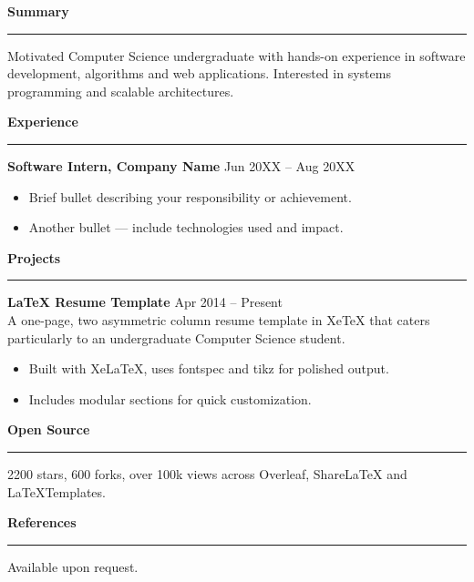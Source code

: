 \documentclass[11pt]{article}
\newcommand{\headingfont}{\sffamily}
\newcommand{\sectitle}[1]{%
  \vspace{4pt}\noindent\textbf{\large\headingfont\color{accent}#1}\vspace{4pt}\par
  \vspace{3pt}\hrule\vspace{5pt}
}
\begin{document}
\begin{minipage}[t]{0.70\textwidth}
  \sectitle{Summary}
  Motivated Computer Science undergraduate with hands-on experience in software development, algorithms and web applications. Interested in systems programming and scalable architectures.

  \vspace{6pt}
  \sectitle{Experience}
  \textbf{Software Intern, Company Name} \hfill {\small Jun 20XX -- Aug 20XX}\\
  \begin{itemize}[leftmargin=*,noitemsep,topsep=0pt]
    \item Brief bullet describing your responsibility or achievement.
    \item Another bullet — include technologies used and impact.
  \end{itemize}

  \vspace{6pt}
  \sectitle{Projects}
  \textbf{LaTeX Resume Template} \hfill {\small Apr 2014 -- Present}\\
  A one-page, two asymmetric column resume template in XeTeX that caters particularly to an undergraduate Computer Science student.
  \begin{itemize}[leftmargin=*,noitemsep,topsep=0pt]
    \item Built with XeLaTeX, uses fontspec and tikz for polished output.
    \item Includes modular sections for quick customization.
  \end{itemize}

  \vspace{6pt}
  \sectitle{Open Source}
  2200 stars, 600 forks, over 100k views across Overleaf, ShareLaTeX and LaTeXTemplates.

  \vspace{6pt}
  \sectitle{References}
  Available upon request.
\end{minipage}
\end{document}
